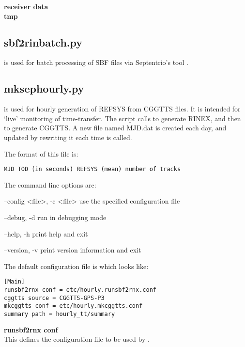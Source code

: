 {\bfseries receiver data}\\

{\bfseries tmp}\\

\subsection{sbf2rinbatch.py}

 is used for batch processing of SBF files via Septentrio's tool .

\subsection{mksephourly.py}

 is used for hourly generation of REFSYS from CGGTTS files. 
It is intended for `live' monitoring of time-transfer.
The script calls  to generate RINEX, and then  to generate CGGTTS.
A new file named MJD.dat is created each day, and updated by rewriting it each time  is called.

The format of this file is:
\begin{lstlisting}
MJD TOD (in seconds) REFSYS (mean) number of tracks
\end{lstlisting}

The command line options are:
\begin{description*}
	\item[--config \textless{file}\textgreater, -c \textless{file}\textgreater] use the specified configuration file
	\item[--debug, -d]	run in debugging mode
	\item[--help, -h]	print help and exit
	\item[--version, -v]	print version information and exit
\end{description*}

The default configuration file is  which looks like:
\begin{lstlisting}
[Main]
runsbf2rnx conf = etc/hourly.runsbf2rnx.conf
cggtts source = CGGTTS-GPS-P3
mkcggtts conf = etc/hourly.mkcggtts.conf
summary path = hourly_tt/summary
\end{lstlisting}

{\bfseries runsbf2rnx conf}\\
This defines the configuration file to be used by .


